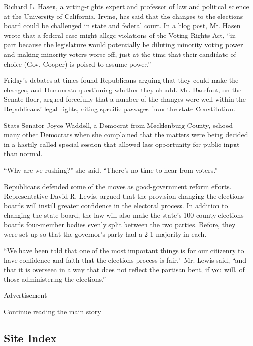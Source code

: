 Richard L. Hasen, a voting-rights expert and professor of law and
political science at the University of California, Irvine, has said that
the changes to the elections board could be challenged in state and
federal court. In a \href{https://electionlawblog.org/?p=89974}{blog
post}, Mr. Hasen wrote that a federal case might allege violations of
the Voting Rights Act, ``in part because the legislature would
potentially be diluting minority voting power and making minority voters
worse off, just at the time that their candidate of choice (Gov. Cooper)
is poised to assume power.''

Friday's debates at times found Republicans arguing that they could make
the changes, and Democrats questioning whether they should. Mr.
Barefoot, on the Senate floor, argued forcefully that a number of the
changes were well within the Republicans' legal rights, citing specific
passages from the state Constitution.

State Senator Joyce Waddell, a Democrat from Mecklenburg County, echoed
many other Democrats when she complained that the matters were being
decided in a hastily called special session that allowed less
opportunity for public input than normal.

``Why are we rushing?'' she said. ``There's no time to hear from
voters.''

Republicans defended some of the moves as good-government reform
efforts. Representative David R. Lewis, argued that the provision
changing the elections boards will instill greater confidence in the
electoral process. In addition to changing the state board, the law will
also make the state's 100 county elections boards four-member bodies
evenly split between the two parties. Before, they were set up so that
the governor's party had a 2-1 majority in each.

``We have been told that one of the most important things is for our
citizenry to have confidence and faith that the elections process is
fair,'' Mr. Lewis said, ``and that it is overseen in a way that does not
reflect the partisan bent, if you will, of those administering the
elections.''

Advertisement

\protect\hyperlink{after-bottom}{Continue reading the main story}

\hypertarget{site-index}{%
\subsection{Site Index}\label{site-index}}

